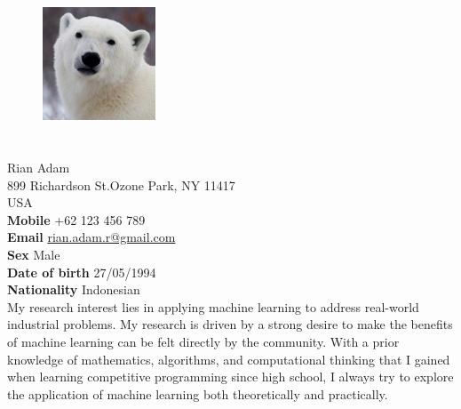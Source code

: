 \documentclass[margin,line,a4paper]{resume}
\begin{document}
\begin{resume}
    \vspace{0.5cm}
    \begin{figure}
        \vspace{-1cm}
       \begin{center}
       \includegraphics[width=0.3\textwidth]{foto}
       \end{center}
        \vspace{-1cm}
    \end{figure}
    


    \section{}%
    Rian Adam \\
    899 Richardson St.Ozone Park, NY 11417 \\ 
    USA \\ 
    \textbf{Mobile} +62 123 456 789  \\
    \textbf{Email} \href{mailto:rian.adam.r@gmail.com}{rian.adam.r@gmail.com} \\
    \textbf{Sex} Male \\ 
    \textbf{Date of birth} 27/05/1994 \\ 
    \textbf{Nationality} Indonesian \\

My research interest lies in applying machine learning to address real-world industrial problems. My research is driven by a strong desire to make the benefits of machine learning can be felt directly by the community. With a prior knowledge of mathematics, algorithms, and computational thinking that I gained when learning competitive programming since high school, I always try to explore the application of machine learning both theoretically and practically.


\end{resume}
\end{document}
